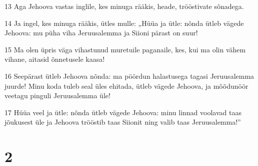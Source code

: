 \par 13 Aga Jehoova vastas inglile, kes minuga rääkis, heade, trööstivate sõnadega.
\par 14 Ja ingel, kes minuga rääkis, ütles mulle: „Hüüa ja ütle: nõnda ütleb vägede Jehoova: mu püha viha Jeruusalemma ja Siioni pärast on suur!
\par 15 Ma olen üpris väga vihastunud muretuile paganaile, kes, kui ma olin vähem vihane, aitasid õnnetusele kaasa!
\par 16 Seepärast ütleb Jehoova nõnda: ma pöördun halastusega tagasi Jeruusalemma juurde! Minu koda tuleb seal üles ehitada, ütleb vägede Jehoova, ja mõõdunöör veetagu pinguli Jeruusalemma üle!
\par 17 Hüüa veel ja ütle: nõnda ütleb vägede Jehoova: minu linnad voolavad taas jõukusest üle ja Jehoova trööstib taas Siionit ning valib taas Jeruusalemma!”


\chapter{2}

